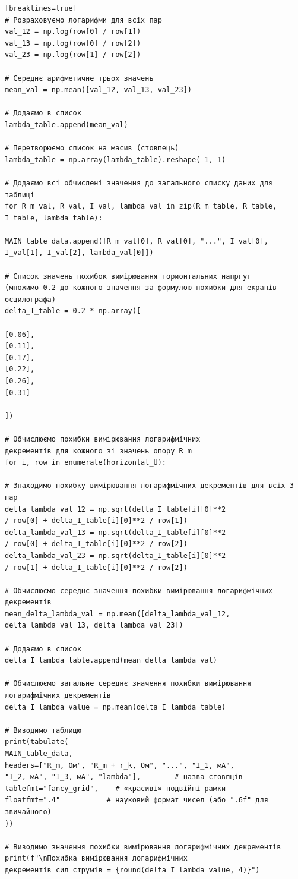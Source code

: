 \documentclass[12pt,a4paper]{article}
\begin{document}
{\begin{verbatim}[breaklines=true]
# Розраховуємо логарифми для всіх пар
val_12 = np.log(row[0] / row[1])
val_13 = np.log(row[0] / row[2])
val_23 = np.log(row[1] / row[2])

# Середнє арифметичне трьох значень
mean_val = np.mean([val_12, val_13, val_23])

# Додаємо в список
lambda_table.append(mean_val)

# Перетворюємо список на масив (стовпець)
lambda_table = np.array(lambda_table).reshape(-1, 1)

# Додаємо всі обчислені значення до загального списку даних для таблиці
for R_m_val, R_val, I_val, lambda_val in zip(R_m_table, R_table, I_table, lambda_table):

MAIN_table_data.append([R_m_val[0], R_val[0], "...", I_val[0],
I_val[1], I_val[2], lambda_val[0]])

# Список значень похибок вимірювання горионтальних напргуг
(множимо 0.2 до кожного значення за формулою похибки для екранів осцилографа)
delta_I_table = 0.2 * np.array([

[0.06],
[0.11],
[0.17],
[0.22],
[0.26],
[0.31]

])

# Обчислюємо похибки вимірювання логарифмічних
декрементів для кожного зі значень опору R_m
for i, row in enumerate(horizontal_U):

# Знаходимо похибку вимірювання логарифмічних декрементів для всіх 3 пар
delta_lambda_val_12 = np.sqrt(delta_I_table[i][0]**2
/ row[0] + delta_I_table[i][0]**2 / row[1])
delta_lambda_val_13 = np.sqrt(delta_I_table[i][0]**2
/ row[0] + delta_I_table[i][0]**2 / row[2])
delta_lambda_val_23 = np.sqrt(delta_I_table[i][0]**2
/ row[1] + delta_I_table[i][0]**2 / row[2])

# Обчислюємо середнє значення похибки вимірювання логарифмічних декрементів
mean_delta_lambda_val = np.mean([delta_lambda_val_12,
delta_lambda_val_13, delta_lambda_val_23])

# Додаємо в список
delta_I_lambda_table.append(mean_delta_lambda_val)

# Обчислюємо загальне середнє значення похибки вимірювання логарифмічних декрементів
delta_I_lambda_value = np.mean(delta_I_lambda_table)

# Виводимо таблицю
print(tabulate(
MAIN_table_data,
headers=["R_m, Ом", "R_m + r_k, Ом", "...", "I_1, мА",
"I_2, мА", "I_3, мА", "lambda"],        # назва стовпців
tablefmt="fancy_grid",    # «красиві» подвійні рамки
floatfmt=".4"           # науковий формат чисел (або ".6f" для звичайного)
))

# Виводимо значення похибки вимірювання логарифмічних декрементів
print(f"\nПохибка вимірювання логарифмічних
декрементів сил струмів = {round(delta_I_lambda_value, 4)}")

    \end{verbatim}}
\end{document}

